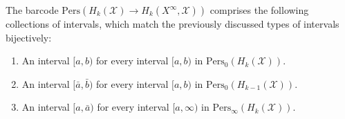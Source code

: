 \begin{corollary}{\cite[Proposition 2.5]{de2011dualities}}
The barcode $\mathrm{Pers}(H_{k}(\mathcal{X}) \rightarrow H_{k}(X^{\infty}, \mathcal{X}))$ comprises the following collections of intervals, which match the previously discussed types of intervals bijectively:
\begin{enumerate}
    \item An interval $[a, b)$ for every interval $[a, b)$ in $\mathrm{Pers}_{0}(H_{k}(\mathcal{X}))$.
    \item An interval $[\bar{a}, \bar{b})$ for every interval $[a, b)$ in $\mathrm{Pers}_{0}(H_{k-1}(\mathcal{X}))$.
    \item An interval $[a, \bar{a})$ for every interval $[a, \infty)$ in $\mathrm{Pers}_{\infty}(H_{k}(\mathcal{X}))$.
\end{enumerate}
\end{corollary}

